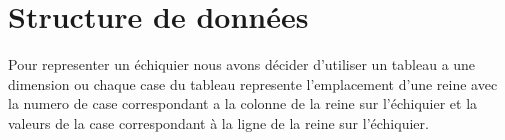 \section{Structure de données}
Pour representer un échiquier nous avons décider d'utiliser un tableau a une dimension ou chaque case du tableau represente l'emplacement d'une reine avec la numero de case correspondant a la colonne de la reine sur l'échiquier et la valeurs de la case correspondant à la ligne de la reine sur l'échiquier. 
